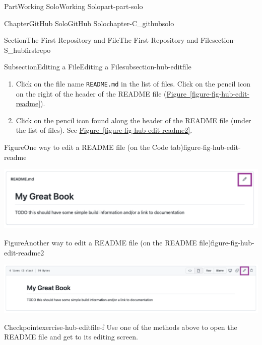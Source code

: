 \documentclass[oneside,10pt,]{book}
\newcommand{\xreffont}{\relax}
\newcommand{\mono}[1]{\texttt{#1}}
\begin{document}
\begin{partptx}{Part}{Working Solo}{}{Working Solo}{}{}{part-part-solo}
\begin{chapterptx}{Chapter}{GitHub Solo}{}{GitHub Solo}{}{}{chapter-C_githubsolo}
\begin{sectionptx}{Section}{The First Repository and File}{}{The First Repository and File}{}{}{section-S_hubfirstrepo}
\begin{subsectionptx}{Subsection}{Editing a File}{}{Editing a File}{}{}{subsection-hub-editfile}
\begin{enumerate}
\item{}Click on the file name \mono{README.md} in the list of files. Click on the pencil icon on the right of the header of the README file (\hyperref[figure-fig-hub-edit-readme]{Figure~{\xreffont\ref{figure-fig-hub-edit-readme}}}).%
\item{}Click on the pencil icon found along the header of the README file (under the list of files). See \hyperref[figure-fig-hub-edit-readme2]{Figure~{\xreffont\ref{figure-fig-hub-edit-readme2}}}.%
\end{enumerate}
%
\begin{figureptx}{Figure}{One way to edit a README file (on the Code tab)}{figure-fig-hub-edit-readme}{}%
\begin{image}{0.05}{0.9}{0.05}{}%
\includegraphics[width=\linewidth]{external/hub_edit_readme_code.pdf}
\end{image}%
\tcblower
\end{figureptx}%
\begin{figureptx}{Figure}{Another way to edit a README file (on the README file)}{figure-fig-hub-edit-readme2}{}%
\begin{image}{0.05}{0.9}{0.05}{}%
\includegraphics[width=\linewidth]{external/hub_edit_readme_file.pdf}
\end{image}%
\tcblower
\end{figureptx}%
\begin{inlineexercise}{Checkpoint}{}{exercise-hub-editfile-f}%
Use one of the methods above to open the README file and get to its editing screen.%
\end{inlineexercise}%

\end{subsectionptx}
\end{sectionptx}
\end{chapterptx}
\end{partptx}
\end{document}
